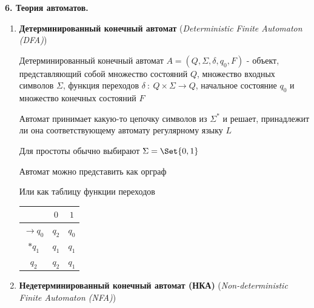 \documentclass[12pt]{article}
\begin{document}
    \begin{center}
        \textbf{6. Теория автоматов.}
    \end{center}


    \begin{enumerate}
        \item \textbf{Детерминированный конечный автомат} (\textit{Deterministic Finite Automaton (DFA)})

        Детерминированный конечный автомат $A = (Q, \Sigma, \delta, q_0, F)$ - объект, представляющий собой множество состояний $Q$, множество входных символов $\Sigma$,
        функция переходов $\delta \ : \ Q \times \Sigma \to Q$, начальное состояние $q_0$ и множество конечных состояний $F$

        Автомат принимает какую-то цепочку символов из $\Sigma^*$ и решает, принадлежит ли она соответствующему автомату регулярному языку $L$

        Для простоты обычно выбирают $\Sigma = \Set{0, 1}$

        Автомат можно представить как орграф


        Или как таблицу функции переходов

        \begin{tabular}{c|cc}
            & $0$   & $1$   \\
            \hline
            $\to q_0$ & $q_2$ & $q_0$ \\
            \hline
            $*q_1$    & $q_1$ & $q_1$ \\
            \hline
            $q_2$     & $q_2$ & $q_1$
        \end{tabular}

        \item \textbf{Недетерминированный конечный автомат (НКА)} (\textit{Non-deterministic Finite Automaton (NFA)})


\end{enumerate}
\end{document}
